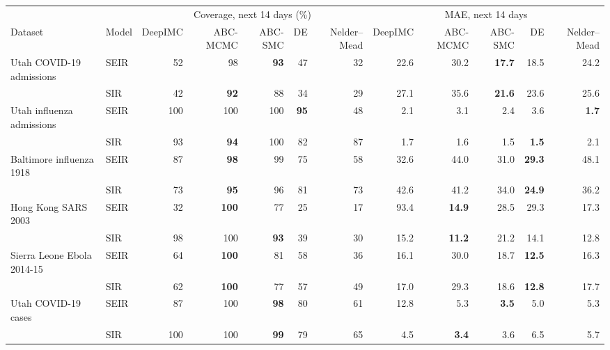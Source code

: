 \begin{tabular}{llrrrrrrrrrr}
\toprule
 &  & \multicolumn{5}{c}{Coverage, next 14 days (\%)} & \multicolumn{5}{c}{MAE, next 14 days} \\
\cmidrule(lr){3-7}\cmidrule(lr){8-12}
Dataset & Model & DeepIMC & ABC-MCMC & ABC-SMC & DE & Nelder--Mead & DeepIMC & ABC-MCMC & ABC-SMC & DE & Nelder--Mead \\
\midrule
Utah COVID-19 admissions & SEIR & 52 & 98 & \textbf{93} & 47 & 32 & 22.6 & 30.2 & \textbf{17.7} & 18.5 & 24.2 \\
 & SIR & 42 & \textbf{92} & 88 & 34 & 29 & 27.1 & 35.6 & \textbf{21.6} & 23.6 & 25.6 \\
Utah influenza admissions & SEIR & 100 & 100 & 100 & \textbf{95} & 48 & 2.1 & 3.1 & 2.4 & 3.6 & \textbf{1.7} \\
 & SIR & 93 & \textbf{94} & 100 & 82 & 87 & 1.7 & 1.6 & 1.5 & \textbf{1.5} & 2.1 \\
Baltimore influenza 1918 & SEIR & 87 & \textbf{98} & 99 & 75 & 58 & 32.6 & 44.0 & 31.0 & \textbf{29.3} & 48.1 \\
 & SIR & 73 & \textbf{95} & 96 & 81 & 73 & 42.6 & 41.2 & 34.0 & \textbf{24.9} & 36.2 \\
Hong Kong SARS 2003 & SEIR & 32 & \textbf{100} & 77 & 25 & 17 & 93.4 & \textbf{14.9} & 28.5 & 29.3 & 17.3 \\
 & SIR & 98 & 100 & \textbf{93} & 39 & 30 & 15.2 & \textbf{11.2} & 21.2 & 14.1 & 12.8 \\
Sierra Leone Ebola 2014-15 & SEIR & 64 & \textbf{100} & 81 & 58 & 36 & 16.1 & 30.0 & 18.7 & \textbf{12.5} & 16.3 \\
 & SIR & 62 & \textbf{100} & 77 & 57 & 49 & 17.0 & 29.3 & 18.6 & \textbf{12.8} & 17.7 \\
Utah COVID-19 cases & SEIR & 87 & 100 & \textbf{98} & 80 & 61 & 12.8 & 5.3 & \textbf{3.5} & 5.0 & 5.3 \\
 & SIR & 100 & 100 & \textbf{99} & 79 & 65 & 4.5 & \textbf{3.4} & 3.6 & 6.5 & 5.7 \\
\bottomrule
\end{tabular}
